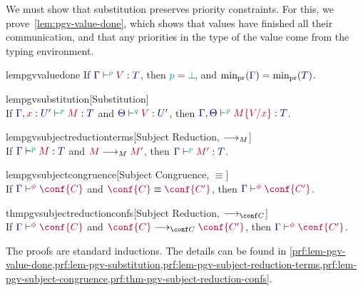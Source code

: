 \documentclass[main.tex]{subfiles}
\begin{document}
We must show that substitution preserves priority constraints. For this, we prove~\cref{lem:pgv-value-done}, which shows that values have finished all their communication, and that any priorities in the type of the value come from the typing environment.
\begin{compacttheorems}
  \begin{restatablelemma}{lempgvvaluedone}
    \label{lem:pgv-value-done}
    If $\tseq[\cs{p}]{\ty{\Gamma}}{V}{T}$, then $\cs{p}=\cs{\pbot}$, and $\minpr(\ty{\Gamma})=\minpr(\ty{T})$.
  \end{restatablelemma}
  \begin{restatablelemma}{lempgvsubstitution}[Substitution]
    \label{lem:pgv-substitution}
    \hfill\\%
    If $\tseq[\cs{p}]{\ty{\Gamma},\tmty{x}{U'}}{M}{T}$ and $\tseq[\cs{q}]{\ty{\Theta}}{V}{U'}$, then $\tseq[\cs{p}]{\ty{\Gamma},\ty{\Theta}}{\subst{M}{V}{x}}{T}$.
  \end{restatablelemma}
  \begin{restatablelemma}{lempgvsubjectreductionterms}[Subject Reduction, $\longrightarrow_{M}$]
    \label{lem:pgv-subject-reduction-terms}
    \hfill\\%
    If $\tseq[\cs{p}]{\ty{\Gamma}}{M}{T}$ and $\tm{M}\tred\tm{M'}$,
    then $\tseq[\cs{p}]{\ty{\Gamma}}{M'}{T}$.
  \end{restatablelemma}
  \begin{restatablelemma}{lempgvsubjectcongruence}[Subject Congruence, $\equiv$]
    \label{lem:pgv-subject-congruence}
    \hfill\\%
    If $\cseq[\phi]{\ty{\Gamma}}{\conf{C}}$ and $\tm{\conf{C}}\equiv\tm{\conf{C'}}$,
    then $\cseq[\phi]{\ty{\Gamma}}{\conf{C'}}$.
  \end{restatablelemma}
  \begin{restatabletheorem}{thmpgvsubjectreductionconfs}[Subject Reduction, $\cred$]
    \label{thm:pgv-subject-reduction-confs}
    \hfill\\%
    If $\cseq[\phi]{\ty{\Gamma}}{\conf{C}}$ and $\tm{\conf{C}}\cred\tm{\conf{C'}}$,
    then $\cseq[\phi]{\ty{\Gamma}}{\conf{C'}}$.
  \end{restatabletheorem}
\end{compacttheorems}
The proofs are standard inductions. The details can be found in \cref{prf:lem-pgv-value-done,prf:lem-pgv-substitution,prf:lem-pgv-subject-reduction-terms,prf:lem-pgv-subject-congruence,prf:thm-pgv-subject-reduction-confs}.
\end{document}
